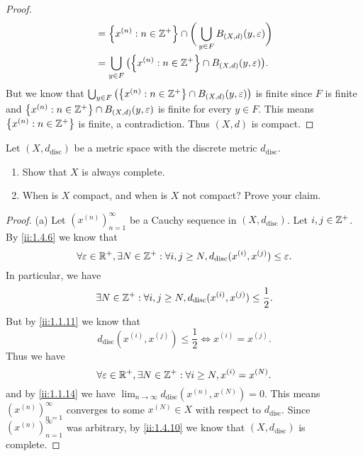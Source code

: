 \begin{proof}
\begin{align*}
                               & = \set{x^{(n)} : n \in \Z^+} \cap \bigg(\bigcup_{y \in F} B_{(X, d)}(y, \varepsilon)\bigg) \\
                               & = \bigcup_{y \in F} \big(\set{x^{(n)} : n \in \Z^+} \cap B_{(X, d)}(y, \varepsilon)\big).
  \end{align*}
  But we know that \(\bigcup_{y \in F} \big(\set{x^{(n)} : n \in \Z^+} \cap B_{(X, d)}(y, \varepsilon)\big)\) is finite since \(F\) is finite and \(\left\lbrace x^{(n)} : n \in \mathbb{Z}^+\right\rbrace \cap B_{(X, d)}(y, \varepsilon)\) is finite for every \(y \in F\).
  This means \(\left\lbrace x^{(n)} : n \in \mathbb{Z}^+\right\rbrace\) is finite, a contradiction.
  Thus \((X, d)\) is compact.
\end{proof}

\begin{ex}\label{ii:ex:1.5.12}
  Let \((X, d_{\text{disc}})\) be a metric space with the discrete metric \(d_{\text{disc}}\).
  \begin{enumerate}
    \item Show that \(X\) is always complete.
    \item When is \(X\) compact, and when is \(X\) not compact?
          Prove your claim.
  \end{enumerate}
\end{ex}

\begin{proof}{(a)}
  Let \((x^{(n)})_{n = 1}^\infty\) be a Cauchy sequence in \((X, d_{\text{disc}})\).
  Let \(i, j \in \mathbb{Z}^+\).
  By \cref{ii:1.4.6} we know that
  \[
    \forall \varepsilon \in \mathbb{R}^+, \exists N \in \mathbb{Z}^+ : \forall i, j \geq N, d_{\text{disc}}(x^{(i)}, x^{(j)}) \leq \varepsilon.
  \]
  In particular, we have
  \[
    \exists N \in \mathbb{Z}^+ : \forall i, j \geq N, d_{\text{disc}}(x^{(i)}, x^{(j)}) \leq \dfrac{1}{2}.
  \]
  But by \cref{ii:1.1.11} we know that
  \[
    d_{\text{disc}}(x^{(i)}, x^{(j)}) \leq \dfrac{1}{2} \iff x^{(i)} = x^{(j)}.
  \]
  Thus we have
  \[
    \forall \varepsilon \in \mathbb{R}^+, \exists N \in \mathbb{Z}^+ : \forall i \geq N, x^{(i)} = x^{(N)}.
  \]
  and by \cref{ii:1.1.14} we have \(\lim_{n \to \infty} d_{\text{disc}}(x^{(n)}, x^{(N)}) = 0\).
  This means \((x^{(n)})_{n = 1}^\infty\) converges to some \(x^{(N)} \in X\) with respect to \(d_{\text{disc}}\).
  Since \((x^{(n)})_{n = 1}^\infty\) was arbitrary, by \cref{ii:1.4.10} we know that \((X, d_{\text{disc}})\) is complete.
\end{proof}

